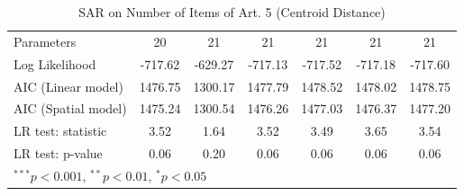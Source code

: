 \begin{table}[!h]
\begin{center}
\begin{tabular}{l c c c c c c }
Parameters              & 20           & 21           & 21           & 21           & 21           & 21           \\
Log Likelihood          & -717.62      & -629.27      & -717.13      & -717.52      & -717.18      & -717.60      \\
AIC (Linear model)      & 1476.75      & 1300.17      & 1477.79      & 1478.52      & 1478.02      & 1478.75      \\
AIC (Spatial model)     & 1475.24      & 1300.54      & 1476.26      & 1477.03      & 1476.37      & 1477.20      \\
LR test: statistic      & 3.52         & 1.64         & 3.52         & 3.49         & 3.65         & 3.54         \\
LR test: p-value        & 0.06         & 0.20         & 0.06         & 0.06         & 0.06         & 0.06         \\
\bottomrule
\multicolumn{7}{l}{\scriptsize{$^{***}p<0.001$, $^{**}p<0.01$, $^*p<0.05$}}
\end{tabular}
\caption{SAR on Number of Items of Art. 5 (Centroid Distance)}
\label{table:coefficients}
\end{center}
\end{table}
